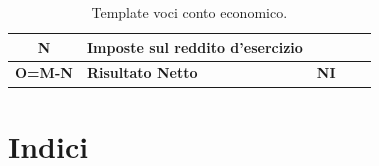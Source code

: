 \documentclass{article}
\begin{document}
\begin{table}[ht]
{\begin{tabular}{|c l|c|l|c|}
            \textbf{N}     & \textbf{Imposte sul reddito d'esercizio}                                &                    &                                                             &           \\
            \hline
            \textbf{O=M-N} & \textbf{Risultato Netto}                                                & \textbf{NI}        &                                                             &           \\
            \hline
        \end{tabular}
    }
    \caption{Template voci conto economico.}
\end{table}

\newpage
\section{Indici}
\setlength{\extrarowheight}{20pt} %
\end{document}
